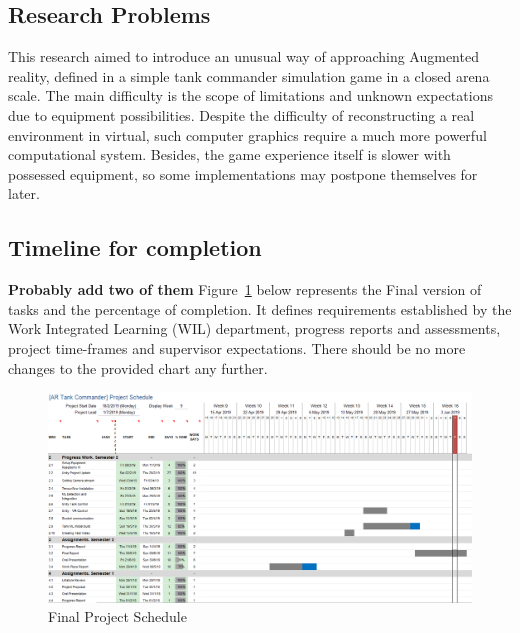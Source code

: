 \subsection{Research Problems}
This research aimed to introduce an unusual way of approaching Augmented reality, defined in a simple tank commander simulation game in a closed arena scale. The main difficulty is the scope of limitations and unknown expectations due to equipment possibilities. Despite the difficulty of reconstructing a real environment in virtual, such computer graphics require a much more powerful computational system. 
Besides, the game experience itself is slower with possessed equipment, so some implementations may postpone themselves for later. \\
\newpage
\begin{landscape}
\section{Timeline for completion}	
\textbf{Probably add two of them}
	Figure~\ref{fig:chart} below represents the Final version of tasks and the percentage of completion.
    It defines requirements established by the Work Integrated Learning (WIL) department, progress reports and assessments, project time-frames and supervisor expectations.
    There should be no more changes to the provided chart any further.
	\begin{figure}[H]
		\centering
		\includegraphics[width=0.8\linewidth]{evaluation/charts/chart3.PNG}
		\caption{Final Project Schedule}
		\label{fig:chart}
	\end{figure}		
\end{landscape}